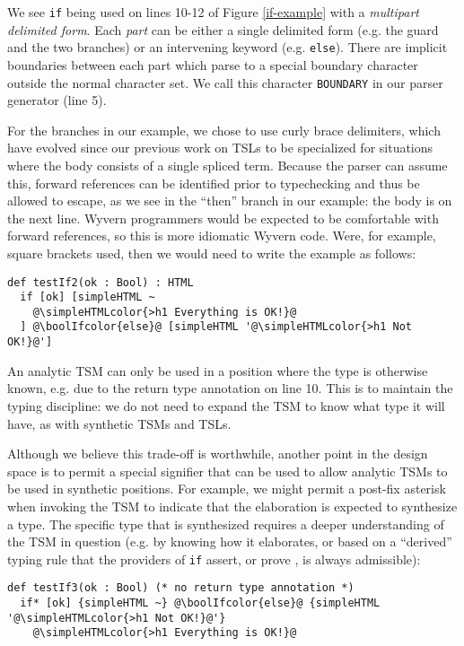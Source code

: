 \documentclass{sig-alternate}
\newcommand{\simpleHTMLcolor}[1]{\textcolor[HTML]{7D5100}{#1}}
\newcommand{\boolIfcolor}[1]{\textcolor[HTML]{5E0C0C}{#1}}
\begin{document}
We see \verb|if| being used on lines 10-12 of Figure \ref{if-example} with a \emph{multipart delimited form}. Each \emph{part} can be either a single delimited form (e.g. the guard and the two branches) or an intervening keyword (e.g. \verb|else|). There are implicit boundaries between each part which parse to  a special boundary character outside the normal character set. We call this character \verb|BOUNDARY| in our parser generator (line 5). 

For the branches in our example, we chose to use curly brace delimiters, which have evolved since our previous work on TSLs to be specialized for situations where the body consists of a single spliced term. Because the parser can assume this, forward references can be identified prior to typechecking and thus be allowed to escape, as we see in the ``then'' branch in our example: the body is on the next line. Wyvern programmers would be expected to be comfortable with forward references, so this is more idiomatic Wyvern code. Were, for example, square brackets used, then we would need to write the example as follows:

\begin{lstlisting}[style=wyvern]
def testIf2(ok : Bool) : HTML
  if [ok] [simpleHTML ~
    @\simpleHTMLcolor{>h1 Everything is OK!}@
  ] @\boolIfcolor{else}@ [simpleHTML '@\simpleHTMLcolor{>h1 Not OK!}@']
\end{lstlisting}

An analytic TSM can only be used in a position where the type is otherwise known, e.g. due to the return type annotation on line 10. This is to maintain the typing discipline: we do not need to expand the TSM to know what type it will have, as with synthetic TSMs and TSLs. 

Although we believe this trade-off is worthwhile, another point in the design space is to permit a special signifier that can be used to allow analytic TSMs to be used in synthetic positions. For example, we might permit a post-fix asterisk when invoking the TSM to indicate that the elaboration is expected to synthesize a type. The specific type that is synthesized requires a deeper understanding of the TSM in question (e.g. by knowing how it elaborates, or based on a ``derived'' typing rule that the providers of \verb|if| assert, or prove \cite{conf/icfp/LorenzenE13}, is always admissible):

\begin{lstlisting}[style=wyvern]
def testIf3(ok : Bool) (* no return type annotation *)
  if* [ok] {simpleHTML ~} @\boolIfcolor{else}@ {simpleHTML '@\simpleHTMLcolor{>h1 Not OK!}@'}
    @\simpleHTMLcolor{>h1 Everything is OK!}@
\end{lstlisting}
\end{document}
